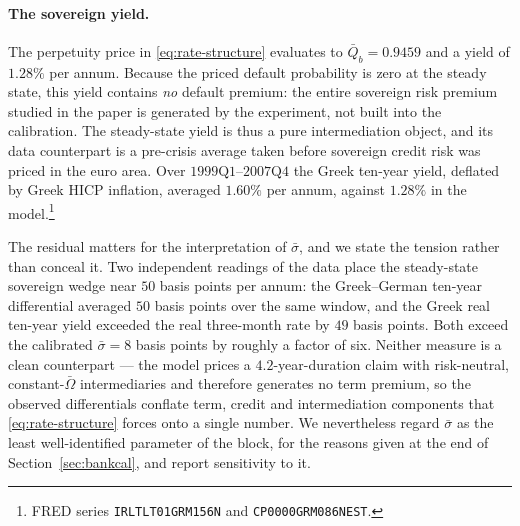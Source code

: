 \paragraph{The sovereign yield.}
The perpetuity price in \eqref{eq:rate-structure} evaluates to $\bar Q_b=0.9459$
and a yield of $1.28\%$ per annum. Because the priced default probability is zero
at the steady state, this yield contains \emph{no} default premium: the entire
sovereign risk premium studied in the paper is generated by the experiment, not
built into the calibration. The steady-state yield is thus a pure intermediation
object, and its data counterpart is a pre-crisis average taken before sovereign
credit risk was priced in the euro area. Over $1999\text{Q}1$--$2007\text{Q}4$ the
Greek ten-year yield, deflated by Greek HICP inflation, averaged $1.60\%$ per
annum, against $1.28\%$ in the model.\footnote{FRED series
\texttt{IRLTLT01GRM156N} and \texttt{CP0000GRM086NEST}.}

The residual matters for the interpretation of $\bar\sigma$, and we state the
tension rather than conceal it. Two independent readings of the data place the
steady-state sovereign wedge near $50$ basis points per annum: the Greek--German
ten-year differential averaged $50$ basis points over the same window, and the
Greek real ten-year yield exceeded the real three-month rate by $49$ basis
points. Both exceed the calibrated $\bar\sigma=8$ basis points by roughly a
factor of six. Neither measure is a clean counterpart --- the model prices a
$4.2$-year-duration claim with risk-neutral, constant-$\bar\Omega$ intermediaries
and therefore generates no term premium, so the observed differentials conflate
term, credit and intermediation components that \eqref{eq:rate-structure} forces
onto a single number. We nevertheless regard $\bar\sigma$ as the least
well-identified parameter of the block, for the reasons given at the end of
Section~\ref{sec:bankcal}, and report sensitivity to it.

